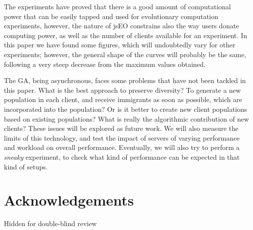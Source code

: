 \documentclass[runningheads,a4paper]{llncs}
\begin{document}
The experiments have proved that there is a good amount of
computational power that can be easily tapped and used for
evolutionary computation experiments, however, the nature of jsEO
constrains also the way users donate computing power, as well as the
number of clients available for an experiment. In this paper we have
found some figures, which will undoubtedly vary for other experiments;
however, the general shape of the curves will probably be the same,
following a very steep decrease from the maximum values obtained. 

The GA, being asynchronous, faces some problems that have not been
tackled in this paper. What is the best approach to preserve
diversity? To generate a new population in each client, and receive
immigrants as soon as possible, which are incorporated into the
population? Or is it better to create new client populations based on
existing populations? What is really the algorithmic contribution of
new clients? These issues will be explored as future work. 
We will also measure the limits of this technology, and test
the impact of servers of varying performance and workload on overall
performance. Eventually, we will also try to perform a {\em sneaky}
experiment, to check what kind of performance can be expected in that
kind of setups. 

\section*{Acknowledgements}

Hidden for double-blind review





\end{document}
